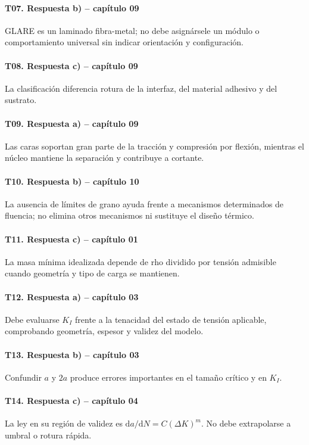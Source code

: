 \paragraph{T07. Respuesta b) -- capítulo 09} GLARE es un laminado fibra-metal; no debe asignársele un módulo o comportamiento universal sin indicar orientación y configuración.

\paragraph{T08. Respuesta c) -- capítulo 09} La clasificación diferencia rotura de la interfaz, del material adhesivo y del sustrato.

\paragraph{T09. Respuesta a) -- capítulo 09} Las caras soportan gran parte de la tracción y compresión por flexión, mientras el núcleo mantiene la separación y contribuye a cortante.

\paragraph{T10. Respuesta b) -- capítulo 10} La ausencia de límites de grano ayuda frente a mecanismos determinados de fluencia; no elimina otros mecanismos ni sustituye el diseño térmico.

\paragraph{T11. Respuesta c) -- capítulo 01} La masa mínima idealizada depende de rho dividido por tensión admisible cuando geometría y tipo de carga se mantienen.

\paragraph{T12. Respuesta a) -- capítulo 03} Debe evaluarse $K_I$ frente a la tenacidad del estado de tensión aplicable, comprobando geometría, espesor y validez del modelo.

\paragraph{T13. Respuesta b) -- capítulo 03} Confundir $a$ y $2a$ produce errores importantes en el tamaño crítico y en $K_I$.

\paragraph{T14. Respuesta c) -- capítulo 04} La ley en su región de validez es $\mathrm{d}a/\mathrm{d}N=C(\Delta K)^m$. No debe extrapolarse a umbral o rotura rápida.

